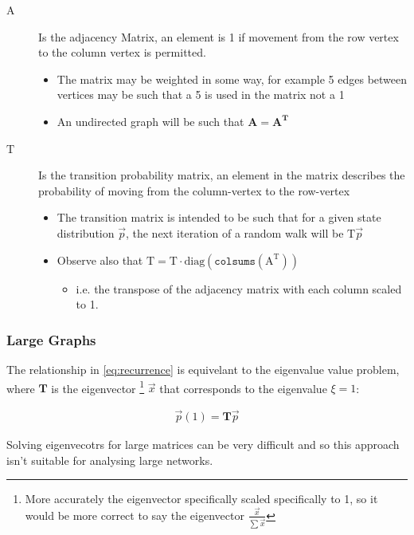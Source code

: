 \documentclass[11pt]{article}
\begin{document}
\begin{description}
\item[{\(\mathrm{A}\)}] Is the adjacency Matrix, an element is 1 if movement from the row vertex to the column vertex is permitted.
\begin{itemize}
\item The matrix may be weighted in some way, for example 5 edges between vertices may be such that a 5 is used in the matrix not a 1
\item An undirected graph will be such that \(\mathbf{A} = \mathbf{A}^{\mathrm{\mathbf{T}}}\)
\end{itemize}
\item[{\(\mathrm{T}\)}] Is the transition probability matrix, an element in the matrix describes the probability of moving from the column-vertex to the row-vertex
\begin{itemize}
\item The transition matrix is intended to be such that for a given state distribution \(\vec{p}\), the next iteration of a random walk will be \(\mathrm{T}\vec{p}\)
\item Observe also that \(\mathrm{T} = \mathrm{T} \cdot \mathrm{diag}(\mathtt{colsums}(\mathrm{A^{\mathrm{T}}}))\)
\begin{itemize}
\item i.e. the transpose of the adjacency matrix with each column scaled to 1.
\end{itemize}
\end{itemize}
\end{description}

\subsubsection{Large Graphs}
\label{sec:org746b07b}


The relationship in \eqref{eq:recurrence} is equivelant to the eigenvalue value problem, where \(\mathbf{T}\) is the eigenvector \footnote{More accurately the eigenvector specifically scaled specifically to 1, so it would be more correct to say the eigenvector \(\frac{\vec{x}}{\sum \vec{x}}\)} \(\vec{x}\) that corresponds to the eigenvalue \(\xi=1\):

\begin{align}
\vec{p} (1) = \mathbf{T} \vec{p} \label{eq:eigenprob}
\end{align}


Solving eigenvecotrs for large matrices can be very difficult and so this approach isn't suitable for analysing large networks.
\end{document}
